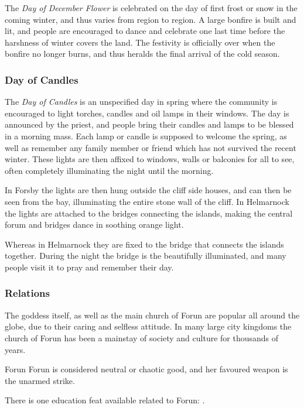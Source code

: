 
The \emph{Day of December Flower} is celebrated on the day of first frost or
snow in the coming winter, and thus varies from region to region. A large
bonfire is built and lit, and people are encouraged to dance and celebrate one
last time before the harshness of winter covers the land. The festivity is
officially over when the bonfire no longer burns, and thus heralds the final
arrival of the cold season.

\subsubsection*{Day of Candles}

The \emph{Day of Candles} is an unspecified day in spring where the community
is encouraged to light torches, candles and oil lamps in their windows. The
day is announced by the priest, and people bring their candles and lamps to be
blessed in a morning mass. Each lamp or candle is supposed to welcome the
spring, as well as remember any family member or friend which has not survived
the recent winter. These lights are then affixed to windows, walls or balconies
for all to see, often completely illuminating the night until the morning.

In Forsby the lights are then hung outside the cliff side houses, and can
then be seen from the bay, illuminating the entire stone wall of the cliff. In
Helmarnock the lights are attached to the bridges connecting the islands,
making the central forum and bridges dance in soothing orange light.

Whereas in Helmarnock they are fixed to the bridge that connects the islands
together. During the night the bridge is the beautifully illuminated, and many
people visit it to pray and remember their day.

\subsubsection*{Relations}

The goddess itself, as well as the main church of Forun are popular all around
the globe, due to their caring and selfless attitude. In many large city
kingdoms the church of Forun has been a mainstay of society and culture for
thousands of years.

\begin{35e}{Forun}
  Forun is considered neutral or chaotic good, and her favoured weapon is the
  unarmed strike.

  There is one education feat available related to Forun:
  .
\end{35e}
